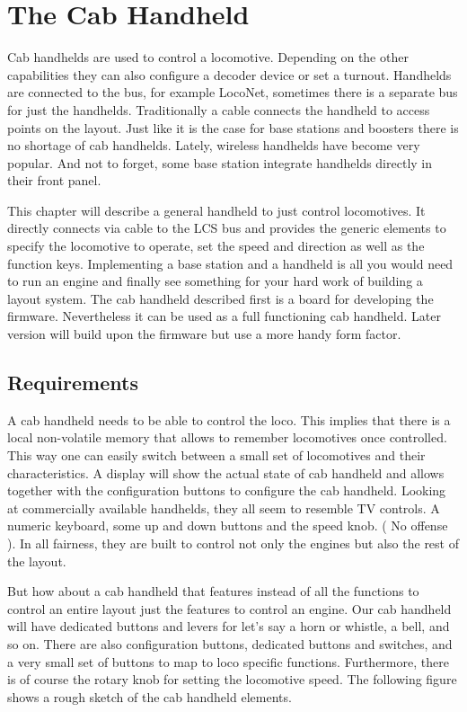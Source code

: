 \chapter{The Cab Handheld}

Cab handhelds are used to control a locomotive. Depending on the other capabilities they can also configure a decoder device or set a turnout. Handhelds are connected to the bus, for example LocoNet, sometimes there is a separate bus for just the handhelds. Traditionally a cable connects the handheld to access points on the layout. Just like it is the case for base stations and boosters there is no shortage of cab handhelds. Lately, wireless handhelds have become very popular. And not to forget, some base station integrate handhelds directly in their front panel.

This chapter will describe a general handheld to just control locomotives. It directly connects via cable to the LCS bus and provides the generic elements to specify the locomotive to operate, set the speed and direction as well as the function keys. Implementing a base station and a handheld is all you would need to run an engine and finally see something for your hard work of building a layout system. The cab handheld described first is a board for developing the firmware. Nevertheless it can be used as a full functioning cab handheld. Later version will build upon the firmware but use a more handy form factor.

\section{Requirements}

A cab handheld needs to be able to control the loco. This implies that there is a local non-volatile memory that allows to remember locomotives once controlled. This way one can easily switch between a small set of locomotives and their characteristics. A display will show the actual state of cab handheld and allows together with the configuration buttons to configure the cab handheld. Looking at commercially available handhelds, they all seem to resemble TV controls. A numeric keyboard, some up and down buttons and the speed knob. ( No offense ). In all fairness, they are built to control not only the engines but also the rest of the layout.

But how about a cab handheld that features instead of all the functions to control an entire layout just the features to control an engine. Our cab handheld will have dedicated buttons and levers for let's say a horn or whistle, a bell, and so on. There are also configuration buttons, dedicated buttons and switches, and a very small set of buttons to map to loco specific functions. Furthermore, there is of course the rotary knob for setting the locomotive speed. The following figure shows a rough sketch of the cab handheld elements.

